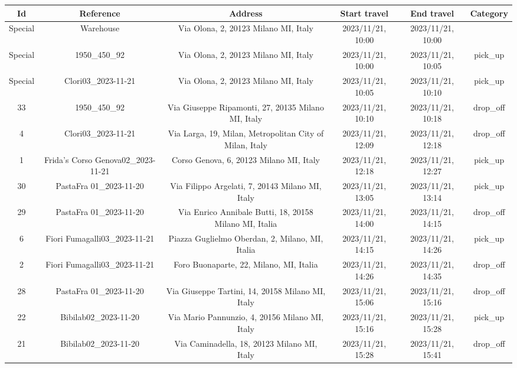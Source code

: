 \documentclass[titlepage]{article}
\begin{document}
\begin{table}[H]
\centering
\begin{adjustbox}{max width=\textwidth}
\begin{tabular}{|c|c|c|c|c|c|}
\hline
Id & Reference & Address & Start travel & End travel & Category\\
\hline
\hline
Special & Warehouse & Via Olona, 2, 20123 Milano MI, Italy & 2023/11/21, 10:00 & 2023/11/21, 10:00 & \\
\hline
Special & 1950\_450\_92 & Via Olona, 2, 20123 Milano MI, Italy & 2023/11/21, 10:00 & 2023/11/21, 10:05 & pick\_up \\
\hline
Special & Clori03\_2023-11-21 & Via Olona, 2, 20123 Milano MI, Italy & 2023/11/21, 10:05 & 2023/11/21, 10:10 & pick\_up \\
\hline
33 & 1950\_450\_92 & Via Giuseppe Ripamonti, 27, 20135 Milano MI, Italy & 2023/11/21, 10:10 &  2023/11/21, 10:18 & drop\_off \\
\hline
4 & Clori03\_2023-11-21 & Via Larga, 19, Milan, Metropolitan City of Milan, Italy & 2023/11/21, 12:09 & 2023/11/21, 12:18 & drop\_off \\
\hline
1 & Frida's Corso Genova02\_2023-11-21 & Corso Genova, 6, 20123 Milano MI, Italy & 2023/11/21, 12:18 & 2023/11/21, 12:27 & pick\_up \\
\hline
30 & PastaFra 01\_2023-11-20 & Via Filippo Argelati, 7, 20143 Milano MI, Italy & 2023/11/21, 13:05 & 2023/11/21, 13:14 & pick\_up \\
\hline
29 & PastaFra 01\_2023-11-20 & Via Enrico Annibale Butti, 18, 20158 Milano MI, Italia & 2023/11/21, 14:00 & 2023/11/21, 14:15 & drop\_off \\
\hline
6 & Fiori Fumagalli03\_2023-11-21 & Piazza Guglielmo Oberdan, 2, Milano, MI, Italia & 2023/11/21, 14:15 & 2023/11/21, 14:26 & pick\_up \\
\hline
2 & Fiori Fumagalli03\_2023-11-21 & Foro Buonaparte, 22, Milano, MI, Italia & 2023/11/21, 14:26 & 2023/11/21, 14:35 & drop\_off \\
\hline
28 & PastaFra 01\_2023-11-20 & Via Giuseppe Tartini, 14, 20158 Milano MI, Italy & 2023/11/21, 15:06 & 2023/11/21, 15:16 & drop\_off \\
\hline
22 & Bibilab02\_2023-11-20 & Via Mario Pannunzio, 4, 20156 Milano MI, Italy & 2023/11/21, 15:16 & 2023/11/21, 15:28 & pick\_up \\
\hline
21 & Bibilab02\_2023-11-20 & Via Caminadella, 18, 20123 Milano MI, Italy & 2023/11/21, 15:28 & 2023/11/21, 15:41 & drop\_off \\

\end{tabular}
\end{adjustbox}
\end{table}
\end{document}
